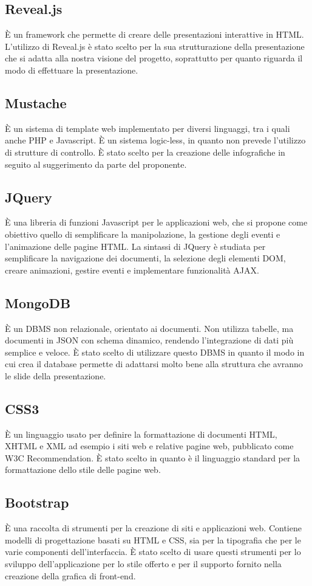 \subsection{Reveal.js}
È un \gls{framework} che permette di creare delle presentazioni interattive in \gls{HTML}.
L'utilizzo di \gls{Reveal.js} è stato scelto per la sua strutturazione della presentazione che si adatta alla nostra visione del progetto, soprattutto per quanto riguarda il modo di effettuare la presentazione.

\subsection{Mustache}
È un sistema di \gls{template} web implementato per diversi linguaggi, tra i quali anche \gls{PHP} e \gls{Javascript}. È un sistema logic-less, in quanto non prevede l'utilizzo di strutture di controllo.
È stato scelto per la creazione delle \gls{infografiche} in seguito al suggerimento da parte del proponente.

\subsection{JQuery}
È una libreria di funzioni \gls{Javascript} per le applicazioni web, che si propone come obiettivo quello di semplificare la manipolazione, la gestione degli eventi e l'animazione delle pagine \gls{HTML}. La sintassi di \gls{JQuery} è studiata per semplificare la navigazione dei documenti, la selezione degli elementi DOM, creare animazioni, gestire eventi e implementare funzionalità \gls{AJAX}.

\subsection{MongoDB}
È un DBMS non relazionale, orientato ai documenti. Non utilizza tabelle, ma documenti in \gls{JSON} con schema dinamico, rendendo l'integrazione di dati più semplice e veloce.
È stato scelto di utilizzare questo \gls{DBMS} in quanto il modo in cui crea il \gls{database} permette di adattarsi molto bene alla struttura che avranno le \gls{slide} della presentazione.

\subsection{CSS3}
È un linguaggio usato per definire la formattazione di documenti \gls{HTML}, XHTML e XML ad esempio i siti web e relative pagine web, pubblicato come \gls{W3C} Recommendation.
È stato scelto in quanto è il linguaggio standard per la formattazione dello stile delle pagine web.

\subsection{Bootstrap}
È una raccolta di strumenti per la creazione di siti e applicazioni web. Contiene modelli di progettazione basati su \gls{HTML} e \gls{CSS}, sia per la tipografia che per le varie componenti dell'interfaccia.
È stato scelto di usare questi strumenti per lo sviluppo dell'applicazione per lo stile offerto e per il supporto fornito nella creazione della grafica di \gls{front-end}.
